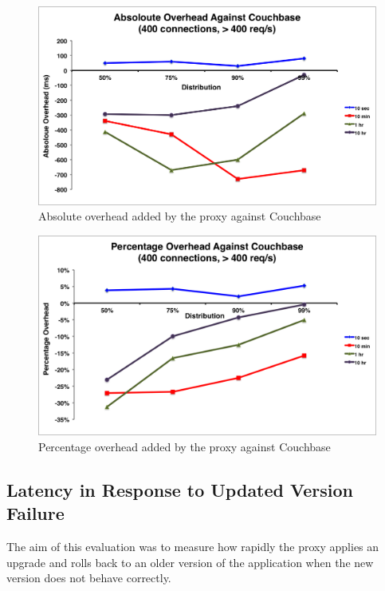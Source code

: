 \documentclass[a4paper,11pt,twoside]{report}
\begin{document}
\begin{figure}[!ht]
  \centering
     \includegraphics[scale=0.55]{absoloute-couchbase}
  \caption{Absolute overhead added by the proxy against Couchbase}
  \label{absoloute-couchbase}
\end{figure} 

\begin{figure}[!ht]
  \centering
     \includegraphics[scale=0.55]{percentage-couchbase}
  \caption{Percentage overhead added by the proxy against Couchbase}
  \label{percentage-couchbase}
\end{figure} 


\subsection{Latency in Response to Updated Version Failure}\label{Recovery}
The aim of this evaluation was to measure how rapidly the proxy applies an upgrade and rolls back to an older version of the application when the new version does not behave correctly. 
\end{document}
